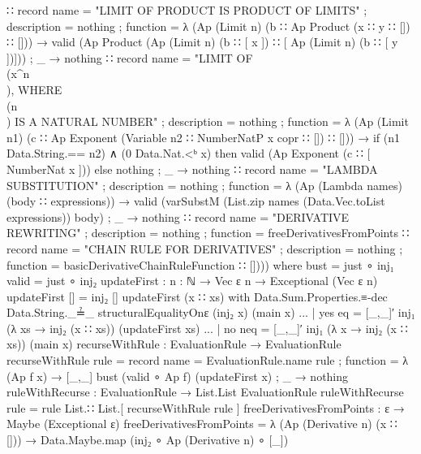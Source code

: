 \documentclass{report}
\begin{document}
\begin{code}
{          }
      ∷ record
          { name = "LIMIT OF PRODUCT IS PRODUCT OF LIMITS"
          ; description = nothing
          ; function =
            λ { (Ap (Limit n) (b ∷ Ap Product (x ∷ y ∷ []) ∷ [])) →
                valid (Ap Product (Ap (Limit n) (b ∷ [ x ]) ∷ [ Ap (Limit n) (b ∷ [ y ])]))
              ; _ → nothing}
          }
      ∷ record
          { name = "LIMIT OF \\(x^n\\), WHERE \\(n\\) IS A NATURAL NUMBER"
          ; description = nothing
          ; function =
            λ { (Ap (Limit n1) (c ∷ Ap Exponent (Variable n2 ∷ NumberNatP x copr ∷ []) ∷ [])) →
                if (n1 Data.String.== n2) ∧ (0 Data.Nat.<ᵇ x)
                   then valid (Ap Exponent (c ∷ [ NumberNat x ]))
                   else nothing
              ; _ → nothing}
          }
      ∷ record
          { name = "LAMBDA SUBSTITUTION"
          ; description = nothing
          ; function =
            λ { (Ap (Lambda names) (body ∷ expressions)) →
                valid (varSubstM (List.zip names (Data.Vec.toList expressions)) body)
              ; _ → nothing}
          }
      ∷ record
          { name = "DERIVATIVE REWRITING"
          ; description = nothing
          ; function = freeDerivativesFromPoints
          }
      ∷ record
          { name = "CHAIN RULE FOR DERIVATIVES"
          ; description = nothing
          ; function = basicDerivativeChainRuleFunction
          }
      ∷ [])))
      where
      bust = just ∘ inj₁
      valid = just ∘ inj₂
      updateFirst : {n : ℕ} → Vec ε n → Exceptional (Vec ε n)
      updateFirst [] = inj₂ []
      updateFirst (x ∷ xs) with
        Data.Sum.Properties.≡-dec
          Data.String._≟_
          structuralEqualityOnε
          (inj₂ x)
          (main x)
      ... | yes eq = [_,_]′ inj₁ (λ xs → inj₂ (x ∷ xs)) (updateFirst xs)
      ... | no neq = [_,_]′ inj₁ (λ x → inj₂ (x ∷ xs)) (main x)
      recurseWithRule : EvaluationRule → EvaluationRule
      recurseWithRule rule = record
        { name = EvaluationRule.name rule
        ; function =
          λ { (Ap f x) → [_,_] bust (valid ∘ Ap f) (updateFirst x)
            ; _ → nothing}
        }
      ruleWithRecurse : EvaluationRule → List.List EvaluationRule
      ruleWithRecurse rule = rule List.∷ List.[ recurseWithRule rule ]
      freeDerivativesFromPoints : ε → Maybe (Exceptional ε)
      freeDerivativesFromPoints =
        λ { (Ap (Derivative n) (x ∷ [])) →
            Data.Maybe.map (inj₂ ∘ Ap (Derivative n) ∘ [_])
}
\end{code}
\end{document}
